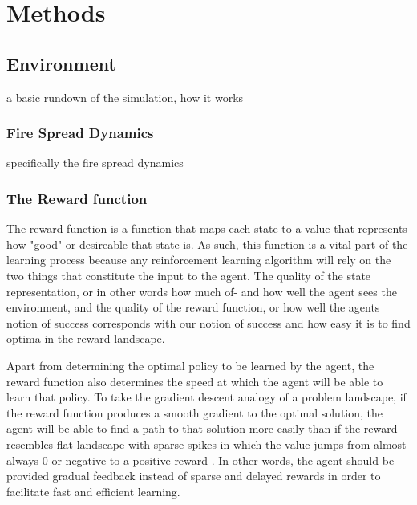 
\section{Methods}\label{sec:methods}

\subsection{Environment}\label{sec:environment}
a basic rundown of the simulation, how it works

\subsubsection{Fire Spread Dynamics}\label{sec:fire_spread}
specifically the fire spread dynamics

\subsubsection{The Reward function}\label{sec:reward_function}
The reward function is a function that maps each state to a value that represents how "good" or desireable that state is. As such, this function is a vital part of the learning process because any reinforcement learning algorithm will rely on the two things that constitute the input to the agent. The quality of the state representation, or in other words how much of- and how well the agent sees the environment, and the quality of the reward function, or how well the agents notion of success corresponds with our notion of success and how easy it is to find optima in the reward landscape.

Apart from determining the optimal policy to be learned by the agent, the reward function also determines the speed at which the agent will be able to learn that policy. To take the gradient descent analogy of a problem landscape, if the reward function produces a smooth gradient to the optimal solution, the agent will be able to find a path to that solution more easily than if the reward resembles flat landscape with sparse spikes in which the value jumps from almost always 0 or negative to a positive reward \citep{sutton_barto_2018}. In other words, the agent should be provided gradual feedback instead of sparse and delayed rewards in order to facilitate fast and efficient learning.

